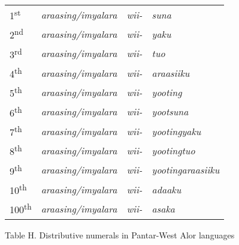 \begin{flushleft}
\tablehead{}
\begin{supertabular}{m{0.5170598in}m{1.3122599in}m{0.33095986in}m{3.50526in}}
1\textsuperscript{st} &
\textit{araasing/imyalara} &
\textit{wii-} &
\textit{suna}\\
2\textsuperscript{nd} &
\textit{araasing/imyalara} &
\textit{wii-} &
\textit{yaku}\\
3\textsuperscript{rd} &
\textit{araasing/imyalara} &
\textit{wii-} &
\textit{tuo}\\
4\textsuperscript{th} &
\textit{araasing/imyalara} &
\textit{wii-} &
\textit{araasiiku}\\
5\textsuperscript{th} &
\textit{araasing/imyalara} &
\textit{wii-} &
\textit{yooting}\\
6\textsuperscript{th} &
\textit{araasing/imyalara} &
\textit{wii-} &
\textit{yootsuna}\\
7\textsuperscript{th} &
\textit{araasing/imyalara} &
\textit{wii-} &
\textit{yootingyaku}\\
8\textsuperscript{th} &
\textit{araasing/imyalara} &
\textit{wii-} &
\textit{yootingtuo}\\
9\textsuperscript{th} &
\textit{araasing/imyalara} &
\textit{wii-} &
\textit{yootingaraasiiku}\\
10\textsuperscript{th} &
\textit{araasing/imyalara} &
\textit{wii-} &
\textit{adaaku}\\
100\textsuperscript{th} &
\textit{araasing/imyalara} &
\textit{wii-} &
\textit{asaka}\\
\end{supertabular}
\end{flushleft}
Table H. Distributive numerals in Pantar-West Alor languages

